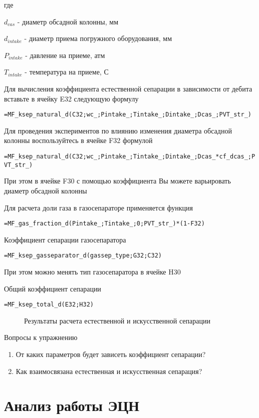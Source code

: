 где

$d_{cas}$ - диаметр обсадной колонны, мм

$d_{intake}$ - диаметр приема погружного оборудования, мм

$P_{intake}$ - давление на приеме, атм

$T_{intake}$ - температура на приеме, С

Для вычисления коэффициента естественной сепарации в зависимости от дебита вставьте в ячейку E32 следующую формулу 

{ \small  \texttt{=MF\_ksep\_natural\_d(C32;wc\_;Pintake\_;Tintake\_;Dintake\_;Dcas\_;PVT\_str\_)}}

Для проведения экспериментов по влиянию изменения диаметра обсадной колонны воспользуйтесь в ячейке F32 формулой

{ \small  \texttt{=MF\_ksep\_natural\_d(C32;wc\_;Pintake\_;Tintake\_;Dintake\_;Dcas\_*cf\_dcas\_;PVT\_str\_)}}

При этом в ячейке F30 с помощью коэффициента Вы можете варьировать диаметр обсадной колонны

Для расчета доли газа в газосепараторе применяется функция

{ \small  \texttt{=MF\_gas\_fraction\_d(Pintake\_;Tintake\_;0;PVT\_str\_)*(1-F32)
}}

Коэффициент сепарации газосепаратора

{ \small  \texttt{=MF\_ksep\_gasseparator\_d(gassep\_type;G32;C32)
}}

При этом можно менять тип газосепаратора в ячейке H30

Общий коэффициент сепарации

{ \small  \texttt{=MF\_ksep\_total\_d(E32;H32)
}}

\begin{figure}[h!]
	\center{\texttt{[image: Ex60\_2]}}
	\caption{Результаты расчета естественной и искусственной сепарации}
	\label{ris:Ex60_2}
\end{figure}

Вопросы к упражнению

\begin{enumerate}
	\item От каких параметров будет зависеть коэффициент сепарации?
	\item Как взаимосвязана естественная и искусственная сепарация? 
\end{enumerate}


\section{Анализ работы ЭЦН}


